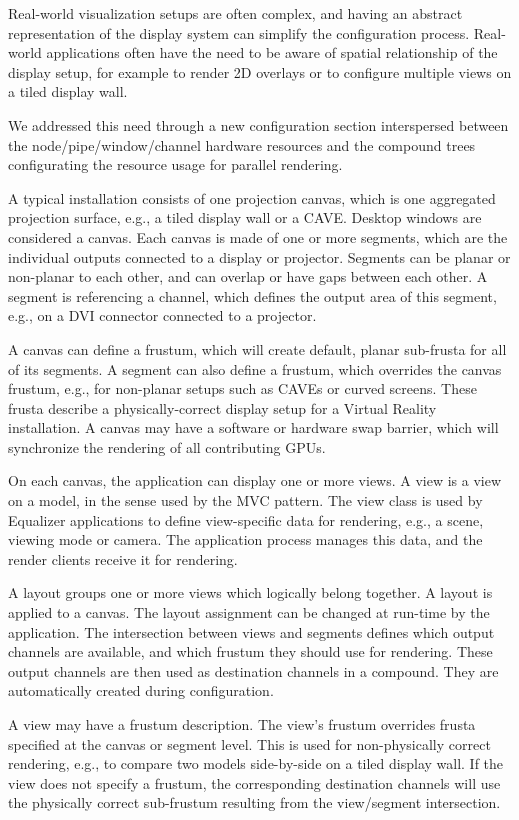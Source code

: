 \documentclass[10pt,journal,compsoc]{IEEEtran}
\begin{document}
Real-world visualization setups are often complex, and having an abstract
representation of the display system can simplify the configuration
process. Real-world applications often have the need to be aware of spatial
relationship of the display setup, for example to render 2D overlays or to
configure multiple views on a tiled display wall.

We addressed this need through a new configuration section interspersed between
the node/pipe/window/channel hardware resources and the compound trees
configurating the resource usage for parallel rendering.

A typical installation consists of one projection canvas, which is one
aggregated projection surface, e.g., a tiled display wall or a CAVE. Desktop
windows are considered a canvas. Each canvas is made of one or more segments,
which are the individual outputs connected to a display or projector. Segments
can be planar or non-planar to each other, and can overlap or have gaps between
each other. A segment is referencing a channel, which defines the output area of
this segment, e.g., on a DVI connector connected to a projector.

A canvas can define a frustum, which will create default, planar sub-frusta for
all of its segments. A segment can also define a frustum, which overrides the
canvas frustum, e.g., for non-planar setups such as CAVEs or curved
screens. These frusta describe a physically-correct display setup for a Virtual
Reality installation. A canvas may have a software or hardware swap barrier,
which will synchronize the rendering of all contributing GPUs.

On each canvas, the application can display one or more views. A view is a view
on a model, in the sense used by the MVC pattern. The view class is used by
Equalizer applications to define view-specific data for rendering, e.g., a
scene, viewing mode or camera. The application process manages this data, and
the render clients receive it for rendering.

A layout groups one or more views which logically belong together. A layout is
applied to a canvas. The layout assignment can be changed at run-time by the
application. The intersection between views and segments defines which output
channels are available, and which frustum they should use for rendering. These
output channels are then used as destination channels in a compound. They are
automatically created during configuration.

A view may have a frustum description. The view's frustum overrides frusta
specified at the canvas or segment level. This is used for non-physically
correct rendering, e.g., to compare two models side-by-side on a tiled display
wall. If the view does not specify a frustum, the corresponding destination
channels will use the physically correct sub-frustum resulting from the
view/segment intersection.
\end{document}
